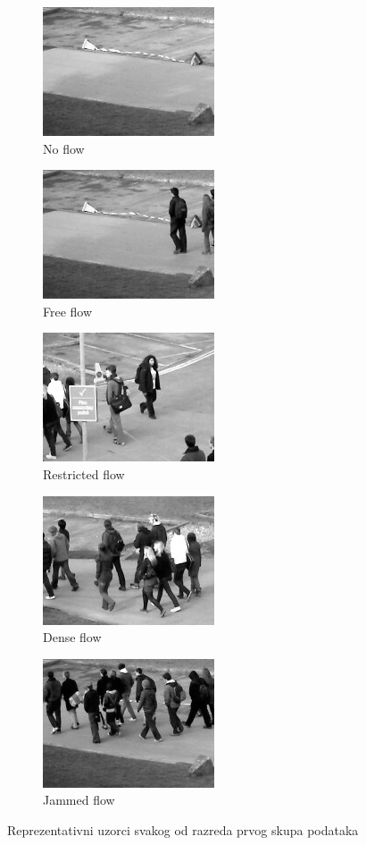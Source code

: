 \documentclass[times, utf8, zavrsni, numeric]{fer}
\begin{document}
\begin{figure}[ht]
	\begin{subfigure}[b]{0.19\linewidth}
		\centering
		\includegraphics[scale=0.5]{img/noflow.jpg}
		\caption{No flow}
	\end{subfigure}
	\begin{subfigure}[b]{0.19\linewidth}
		\centering
		\includegraphics[scale=0.5]{img/freeflow.jpg}
		\caption{Free flow}
	\end{subfigure}
	\begin{subfigure}[b]{0.19\linewidth}
		\centering
		\includegraphics[scale=0.5]{img/restrictedflow.jpg}
		\caption{Restricted flow}
	\end{subfigure}
	\begin{subfigure}[b]{0.19\linewidth}
		\centering
		\includegraphics[scale=0.5]{img/denseflow.jpg}
		\caption{Dense flow}
	\end{subfigure}
	\begin{subfigure}[b]{0.19\linewidth}
		\centering
		\includegraphics[scale=0.5]{img/jammedflow.jpg}
		\caption{Jammed flow}
	\end{subfigure}
\caption{Reprezentativni uzorci svakog od razreda prvog skupa podataka}
\end{figure}
\end{document}
